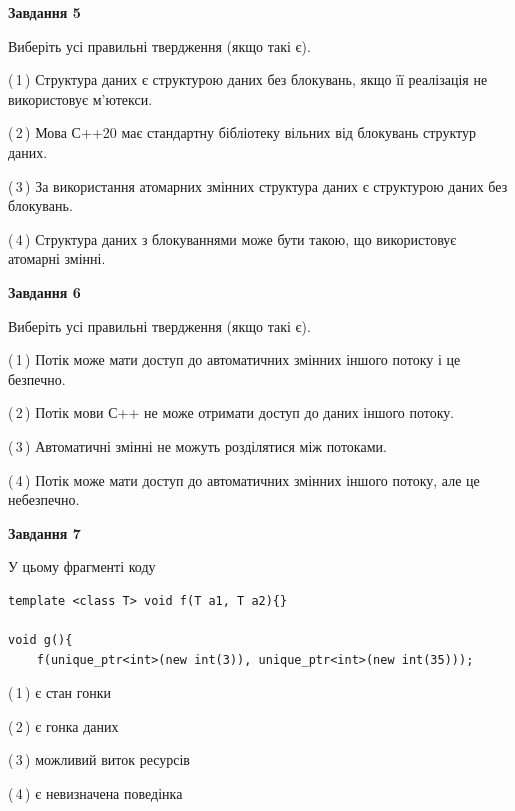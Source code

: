 \documentclass[12pt, ukrainian]{article}
\begin{document}
\begin {large}
{\begin{center}
\textbf{Завдання 5}
\end{center}

Виберіть усі правильні твердження (якщо такі є).\par
\vspace{2mm}

(\,1\,) Структура даних є структурою даних без блокувань, якщо її реалізація не використовує м’ютекси.%

(\,2\,) Мова С++20 має стандартну бібліотеку вільних від блокувань структур даних.%

(\,3\,) За використання атомарних змінних структура даних є структурою даних без блокувань.%

(\,4\,) Структура даних з блокуваннями може бути такою, що використовує атомарні змінні.%
\newpage


\begin{center}
\textbf{Завдання 6}
\end{center}

Виберіть усі правильні твердження (якщо такі є).\par
\vspace{2mm}

(\,1\,) Потік може мати доступ до автоматичних змінних іншого потоку і це безпечно.%

(\,2\,) Потік мови С++ не може отримати доступ до даних іншого потоку.%

(\,3\,) Автоматичні змінні не можуть розділятися між потоками.%

(\,4\,) Потік може мати доступ до автоматичних змінних іншого потоку, але це небезпечно.%


\begin{center}
\textbf{Завдання 7}
\end{center}

У цьому фрагменті коду
\begin{verbatim}
template <class T> void f(T a1, T a2){}

void g(){
    f(unique_ptr<int>(new int(3)), unique_ptr<int>(new int(35)));
\end{verbatim}

(\,1\,) є стан гонки%

(\,2\,) є гонка даних%

(\,3\,) можливий виток ресурсів%

(\,4\,) є невизначена поведінка%

}
\end {large}

\vspace{4mm}
\newpage
\end{document}
